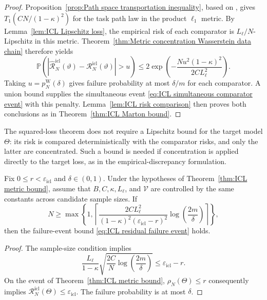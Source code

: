 \begin{proof}
Proposition~\ref{prop:Path space transportation inequality}, based on \cite[Theorem~2.5]{DjelloutGuillinWu2004}, gives \(T_1(CN/(1-\kappa)^2)\) for the task path law in the product \(\ell_1\) metric. By Lemma~\ref{lem:ICL Lipschitz loss}, the empirical risk of each comparator is \(L_\ell/N\)-Lipschitz in this metric. Theorem~\ref{thm:Metric concentration Wasserstein data chain} therefore yields
\[
\mathbb P\left(
\left|\widehat{\mathcal R}_N^{\mathrm{icl}}(\vartheta)
-\mathcal R_N^{\mathrm{icl}}(\vartheta)\right|>u\right)
\leqslant2\exp\left(-\frac{Nu^2(1-\kappa)^2}{2CL_\ell^2}\right).
\]
Taking \(u=p_N^{\mathrm W}(\delta)\) gives failure probability at most \(\delta/m\) for each comparator. A union bound supplies the simultaneous event \eqref{eq:ICL simultaneous comparator event} with this penalty. Lemma~\ref{lem:ICL risk comparison} then proves both conclusions as in Theorem~\ref{thm:ICL Marton bound}.
\end{proof}

The squared-loss theorem does not require a Lipschitz bound for the target model \(\Theta\): its risk is compared deterministically with the comparator risks, and only the latter are concentrated. Such a bound is needed if concentration is applied directly to the target loss, as in the empirical-discrepancy formulation.

\begin{proposition}
\label{prop:ICL metric sample complexity}
Fix \(0\leqslant r<\varepsilon_{\mathrm{icl}}\) and \(\delta\in(0,1)\). Under the hypotheses of Theorem~\ref{thm:ICL metric bound}, assume that \(B,C,\kappa,L_\ell\), and \(\mathcal V\) are controlled by the same constants across candidate sample sizes. If
\begin{equation}
\label{eq:ICL metric sample complexity}
N\geqslant\max\left\{1,
\left\lceil\frac{2CL_\ell^2}{(1-\kappa)^2(\varepsilon_{\mathrm{icl}}-r)^2}
\log\left(\frac{2m}{\delta}\right)\right\rceil\right\},
\end{equation}
then the failure-event bound \eqref{eq:ICL residual failure event} holds.
\end{proposition}

\begin{proof}
The sample-size condition implies
\[
\frac{L_\ell}{1-\kappa}\sqrt{\frac{2C}{N}\log\left(\frac{2m}{\delta}\right)}
\leqslant\varepsilon_{\mathrm{icl}}-r.
\]
On the event of Theorem~\ref{thm:ICL metric bound}, \(\rho_N(\Theta)\leqslant r\) consequently implies \(\mathcal R_N^{\mathrm{icl}}(\Theta)\leqslant\varepsilon_{\mathrm{icl}}\). The failure probability is at most \(\delta\).
\end{proof}


